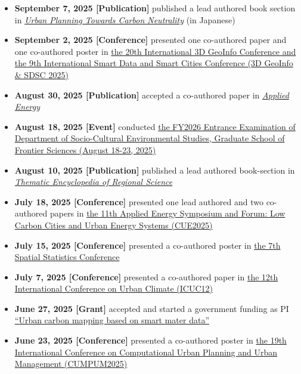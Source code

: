 \documentclass[
]{book}
\providecommand{\tightlist}{%
  \setlength{\itemsep}{0pt}\setlength{\parskip}{0pt}}
\begin{document}
\begin{itemize}
\tightlist
\item
  \textbf{September 7, 2025 {[}Publication{]}} published a lead authored book section in \href{https://book.gakugei-pub.co.jp/gakugei-book/9784761533144/}{\emph{Urban Planning Towards Carbon Neutrality}} (in Japanese)
\item
  \textbf{September 2, 2025 {[}Conference{]}} presented one co-authored paper and one co-authored poster in \href{https://www.csis.u-tokyo.ac.jp/3d_geoinfo_sdsc_2025/overview.html}{the 20th International 3D GeoInfo Conference and the 9th International Smart Data and Smart Cities Conference (3D GeoInfo \& SDSC 2025)}
\item
  \textbf{August 30, 2025 {[}Publication{]}} accepted a co-authored paper in \href{https://doi.org/10.1016/j.apenergy.2025.126697}{\emph{Applied Energy}}
\item
  \textbf{August 18, 2025 {[}Event{]}} conducted \href{https://sbk.k.u-tokyo.ac.jp/admission_e.html}{the FY2026 Entrance Examination of Department of Socio-Cultural Environmental Studies, Graduate School of Frontier Sciences (August 18-23, 2025)}
\item
  \textbf{August 10, 2025 {[}Publication{]}} published a lead authored book-section in \href{https://www.e-elgar.com/shop/gbp/thematic-encyclopedia-of-regional-science-9781800379275.html}{\emph{Thematic Encyclopedia of Regional Science}}
\item
  \textbf{July 18, 2025 {[}Conference{]}} presented one lead authored and two co-authored papers in \href{https://applied-energy.org/cue2025/index}{the 11th Applied Energy Symposium and Forum: Low Carbon Cities and Urban Energy Systems (CUE2025)}
\item
  \textbf{July 15, 2025 {[}Conference{]}} presented a co-authored poster in \href{https://www.elsevier.com/events/conferences/all/spatial-statistics}{the 7th Spatial Statistics Conference}
\item
  \textbf{July 7, 2025 {[}Conference{]}} presented a co-authored paper in \href{https://icuc12.eu/}{the 12th International Conference on Urban Climate (ICUC12)}
\item
  \textbf{June 27, 2025 {[}Grant{]}} accepted and started a government funding as PI \href{https://www.teitanso.or.jp/smamedata/download/}{``Urban carbon mapping based on smart mater data''}
\item
  \textbf{June 23, 2025 {[}Conference{]}} presented a co-authored poster in \href{https://www.ucl.ac.uk/bartlett/casa/about/cupum-2025}{the 19th International Conference on Computational Urban Planning and Urban Management (CUMPUM2025)}

\end{itemize}
\end{document}
